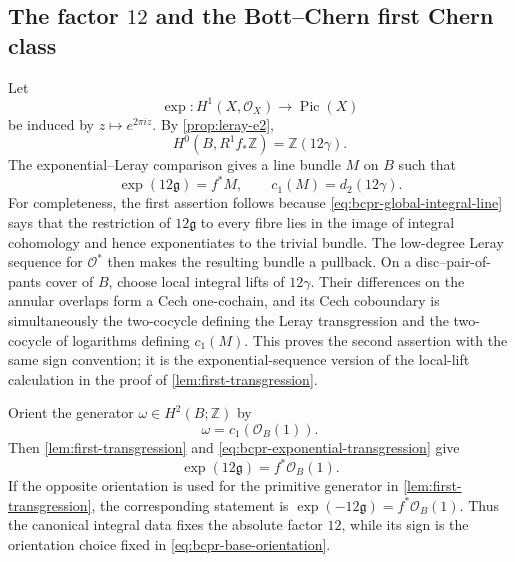 \subsection{The factor \texorpdfstring{$12$}{12} and the Bott--Chern first Chern class}

Let
\[
 \exp\colon H^1(X,\mathcal O_X)\longrightarrow\operatorname{Pic}(X)
\]
be induced by $z\mapsto e^{2\pi iz}$.  By
\cref{prop:leray-e2},
\begin{equation}
 H^0(B,R^1f_*\mathbb Z)=\mathbb Z(12\gamma).
\label{eq:bcpr-global-integral-line}
\end{equation}
The exponential--Leray comparison gives a line bundle $M$ on $B$ such
that
\begin{equation}
 \exp(12\mathfrak g)=f^*M,
 \qquad c_1(M)=d_2(12\gamma).
\label{eq:bcpr-exponential-transgression}
\end{equation}
For completeness, the first assertion follows because
\cref{eq:bcpr-global-integral-line} says that the restriction of
$12\mathfrak g$ to every fibre lies in the image of integral cohomology
and hence exponentiates to the trivial bundle.  The low-degree Leray
sequence for $\mathcal O^*$ then makes the resulting bundle a pullback.
On a disc--pair-of-pants cover of $B$, choose local integral lifts of
$12\gamma$.  Their differences on the annular overlaps form a Cech
one-cochain, and its Cech coboundary is simultaneously the two-cocycle
defining the Leray transgression and the two-cocycle of logarithms defining
$c_1(M)$.  This proves the second assertion with the same sign convention;
it is the exponential-sequence version of the local-lift calculation in
the proof of \cref{lem:first-transgression}.

Orient the generator $\omega\in H^2(B;\mathbb Z)$ by
\begin{equation}
 \omega=c_1(\mathcal O_B(1)).
\label{eq:bcpr-base-orientation}
\end{equation}
Then \cref{lem:first-transgression} and
\cref{eq:bcpr-exponential-transgression} give
\begin{equation}
 \exp(12\mathfrak g)=f^*\mathcal O_B(1).
\label{eq:bcpr-factor-twelve}
\end{equation}
If the opposite orientation is used for the primitive generator in
\cref{lem:first-transgression}, the corresponding statement is
$\exp(-12\mathfrak g)=f^*\mathcal O_B(1)$.  Thus the canonical integral
data fixes the absolute factor $12$, while its sign is the orientation
choice fixed in \cref{eq:bcpr-base-orientation}.

